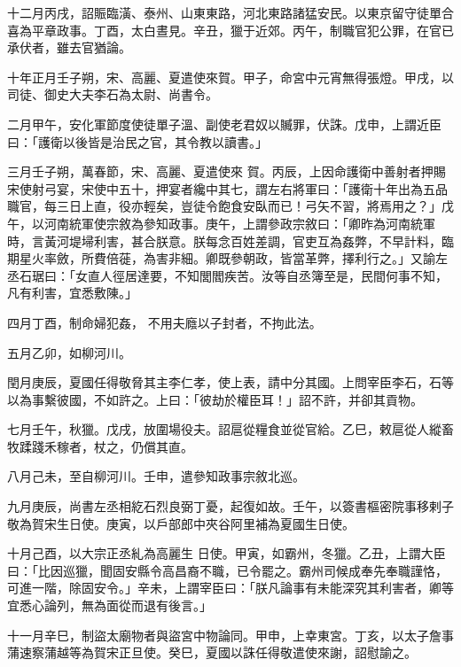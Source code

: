 \begin{pinyinscope}
 十二月丙戌，詔賑臨潢、泰州、山東東路，河北東路諸猛安民。以東京留守徒單合喜為平章政事。丁酉，太白晝見。辛丑，獵于近郊。丙午，制職官犯公罪，在官已承伏者，雖去官猶論。



 十年正月壬子朔，宋、高麗、夏遣使來賀。甲子，命宮中元宵無得張燈。甲戌，以司徒、御史大夫李石為太尉、尚書令。



 二月甲午，安化軍節度使徒單子溫、副使老君奴以贓罪，伏誅。戊申，上謂近臣曰：「護衛以後皆是治民之官，其令教以讀書。」



 三月壬子朔，萬春節，宋、高麗、夏遣使來
 賀。丙辰，上因命護衛中善射者押賜宋使射弓宴，宋使中五十，押宴者纔中其七，謂左右將軍曰：「護衛十年出為五品職官，每三日上直，役亦輕矣，豈徒令飽食安臥而已！弓矢不習，將焉用之？」戊午，以河南統軍使宗敘為參知政事。庚午，上謂參政宗敘曰：「卿昨為河南統軍時，言黃河堤埽利害，甚合朕意。朕每念百姓差調，官吏互為姦弊，不早計料，臨期星火率斂，所費倍蓰，為害非細。卿既參朝政，皆當革弊，擇利行之。」又諭左丞石琚曰：「女直人徑居達要，不知閭閻疾苦。汝等自丞簿至是，民間何事不知，凡有利害，宜悉敷陳。」



 四月丁酉，制命婦犯姦，
 不用夫廕以子封者，不拘此法。



 五月乙卯，如柳河川。



 閏月庚辰，夏國任得敬脅其主李仁孝，使上表，請中分其國。上問宰臣李石，石等以為事繫彼國，不如許之。上曰：「彼劫於權臣耳！」詔不許，并卻其貢物。



 七月壬午，秋獵。戊戌，放圍場役夫。詔扈從糧食並從官給。乙巳，敕扈從人縱畜牧蹂踐禾稼者，杖之，仍償其直。



 八月己未，至自柳河川。壬申，遣參知政事宗敘北巡。



 九月庚辰，尚書左丞相紇石烈良弼丁憂，起復如故。壬午，以簽書樞密院事移剌子敬為賀宋生日使。庚寅，以戶部郎中夾谷阿里補為夏國生日使。



 十月己酉，以大宗正丞糺為高麗生
 日使。甲寅，如霸州，冬獵。乙丑，上謂大臣曰：「比因巡獵，聞固安縣令高昌裔不職，已令罷之。霸州司候成奉先奉職謹恪，可進一階，除固安令。」辛未，上謂宰臣曰：「朕凡論事有未能深究其利害者，卿等宜悉心論列，無為面從而退有後言。」



 十一月辛巳，制盜太廟物者與盜宮中物論同。甲申，上幸東宮。丁亥，以太子詹事蒲速察蒲越等為賀宋正旦使。癸巳，夏國以誅任得敬遣使來謝，詔慰諭之。




\end{pinyinscope}
